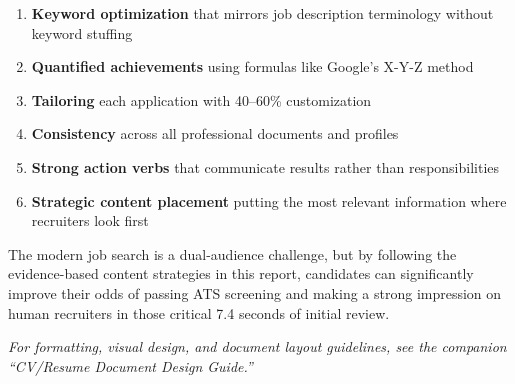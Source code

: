 \documentclass[11pt,a4paper]{article}
\begin{document}
\begin{enumerate}
    \item \textbf{Keyword optimization} that mirrors job description terminology without keyword stuffing
    \item \textbf{Quantified achievements} using formulas like Google's X-Y-Z method
    \item \textbf{Tailoring} each application with 40--60\% customization
    \item \textbf{Consistency} across all professional documents and profiles
    \item \textbf{Strong action verbs} that communicate results rather than responsibilities
    \item \textbf{Strategic content placement} putting the most relevant information where recruiters look first
\end{enumerate}

The modern job search is a dual-audience challenge, but by following the evidence-based content strategies in this report, candidates can significantly improve their odds of passing ATS screening and making a strong impression on human recruiters in those critical 7.4 seconds of initial review.

\textit{For formatting, visual design, and document layout guidelines, see the companion ``CV/Resume Document Design Guide.''}
\end{document}

